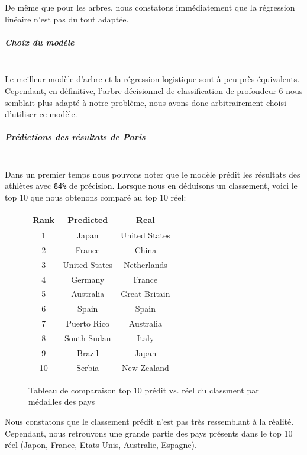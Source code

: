 \documentclass{article}
\begin{document}
De même que pour les arbres, nous constatons immédiatement que la régression linéaire n'est pas du tout adaptée.

\subparagraph{Choix du modèle}
\ \\

Le meilleur modèle d'arbre et la régression logistique sont à peu près équivalents. Cependant, en définitive, l'arbre décisionnel de classification de profondeur 6 nous semblait plus adapté à notre problème, nous avons donc arbitrairement choisi d'utiliser ce modèle.

\subparagraph{Prédictions des résultats de Paris}
\ \\

Dans un premier temps nous pouvons noter que le modèle prédit les résultats des athlètes avec \verb|84%| de précision. Lorsque nous en déduisons un classement, voici le top 10 que nous obtenons comparé au top 10 réel:
\begin{figure}[H]

\caption{Tableau de comparaison top 10 prédit vs. réel du classment par médailles des pays}
\begin{center}
\begin{tabular}{|c|c|c|}
     \hline
     Rank & Predicted     & Real \\
     \hline
     1    & Japan         & United States \\
     2    & France        & China \\
     3    & United States & Netherlands \\
     4    & Germany       & France \\
     5    & Australia     & Great Britain \\
     6    & Spain         & Spain \\
     7    & Puerto Rico   & Australia \\
     8    & South Sudan   &	Italy \\
     9    & Brazil        & Japan \\
     10   & Serbia        & New Zealand \\
     \hline
\end{tabular}
\end{center}

\end{figure}

Nous constatons que le classement prédit n'est pas très ressemblant à la réalité. Cependant, nous retrouvons une grande partie des pays présents dans le top 10 réel (Japon, France, Etats-Unis, Australie, Espagne).
\\
\end{document}
